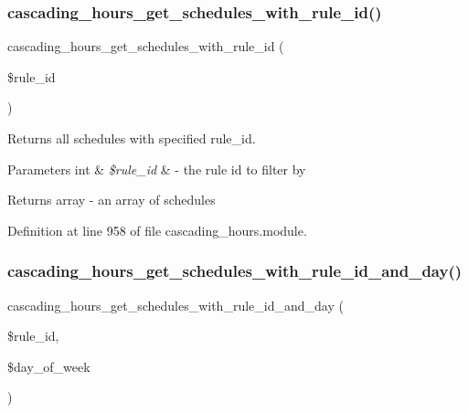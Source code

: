 \subsubsection{\texorpdfstring{cascading\+\_\+hours\+\_\+get\+\_\+schedules\+\_\+with\+\_\+rule\+\_\+id()}{cascading\_hours\_get\_schedules\_with\_rule\_id()}}
{\footnotesize\ttfamily cascading\+\_\+hours\+\_\+get\+\_\+schedules\+\_\+with\+\_\+rule\+\_\+id (\begin{DoxyParamCaption}\item[{}]{\$rule\+\_\+id }\end{DoxyParamCaption})}



Returns all schedules with specified rule\+\_\+id. 


\begin{DoxyParams}[1]{Parameters}
int & {\em \$rule\+\_\+id} & -\/ the rule id to filter by \\
\hline
\end{DoxyParams}
\begin{DoxyReturn}{Returns}
array -\/ an array of schedules 
\end{DoxyReturn}


Definition at line 958 of file cascading\+\_\+hours.\+module.

\mbox{\label{cascading__hours_8module_a57a2e94943a8f166e6fd88d4c7c6c4c1_a57a2e94943a8f166e6fd88d4c7c6c4c1}} 
\subsubsection{\texorpdfstring{cascading\+\_\+hours\+\_\+get\+\_\+schedules\+\_\+with\+\_\+rule\+\_\+id\+\_\+and\+\_\+day()}{cascading\_hours\_get\_schedules\_with\_rule\_id\_and\_day()}}
{\footnotesize\ttfamily cascading\+\_\+hours\+\_\+get\+\_\+schedules\+\_\+with\+\_\+rule\+\_\+id\+\_\+and\+\_\+day (\begin{DoxyParamCaption}\item[{}]{\$rule\+\_\+id,  }\item[{}]{\$day\+\_\+of\+\_\+week }\end{DoxyParamCaption})}



